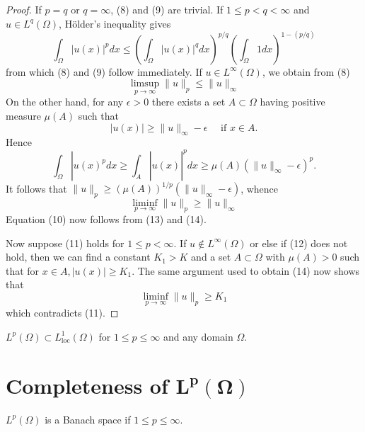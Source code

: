 \begin{proof}
  If $p=q$ or $q=\infty$, (8) and (9) are trivial. If $1 \leq p<q<\infty$ and $u \in L^q(\Omega)$, Hölder's inequality gives
  \[
  \int_{\Omega}|u(x)|^p d x \leq\left(\int_{\Omega}|u(x)|^q d x\right)^{p / q}\left(\int_{\Omega} 1 d x\right)^{1-(p / q)}
  \]
  from which (8) and (9) follow immediately. If $u \in L^{\infty}(\Omega)$, we obtain from (8)
  \begin{equation}\label{eq:2.13}
    \limsup_{p\rightarrow \infty}\|u\|_p \leq\|u\|_{\infty}
  \end{equation}
  On the other hand, for any $\epsilon>0$ there exists a set $A \subset \Omega$ having positive measure $\mu(A)$ such that
  \[
  |u(x)| \geq\|u\|_{\infty}-\epsilon \quad \text { if } x \in A .
  \]
  Hence
  \[
  \left.\int_{\Omega}\left|u(x)^p d x \geq \int_A\right| u(x)\right|^p d x \geq \mu(A)\left(\|u\|_{\infty}-\epsilon\right)^p .
  \]
  It follows that $\|u\|_p \geq(\mu(A))^{1 / p}\left(\|u\|_{\infty}-\epsilon\right)$, whence
  \begin{equation}\label{eq:2.14}
    \liminf_{p \rightarrow \infty}\|u\|_p \geq\|u\|_{\infty}
  \end{equation}
  Equation (10) now follows from (13) and (14).
  
  Now suppose (11) holds for $1 \leq p<\infty$. If $u \notin L^{\infty}(\Omega)$ or else if (12) does not hold, then we can find a constant $K_1>K$ and a set $A \subset \Omega$ with $\mu(A)>0$ such that for $x \in A,|u(x)| \geq K_1$. The same argument used to obtain (14) now shows that
  \[
  \liminf _{p \rightarrow \infty}\|u\|_p \geq K_1
  \]
  which contradicts (11).
\end{proof}

\begin{corollary}
  $L^p(\Omega) \subset L_{\mathrm{loc}}^1(\Omega)$ for $1 \leq p \leq \infty$ and any domain $\Omega$.
\end{corollary}


\section[Completeness of $L^p(\Omega)$]{Completeness of $\bm{L^p(\Omega)}$}

\begin{theorem}
  $L^p(\Omega)$ is a Banach space if $1 \leq p \leq \infty$.
\end{theorem}

